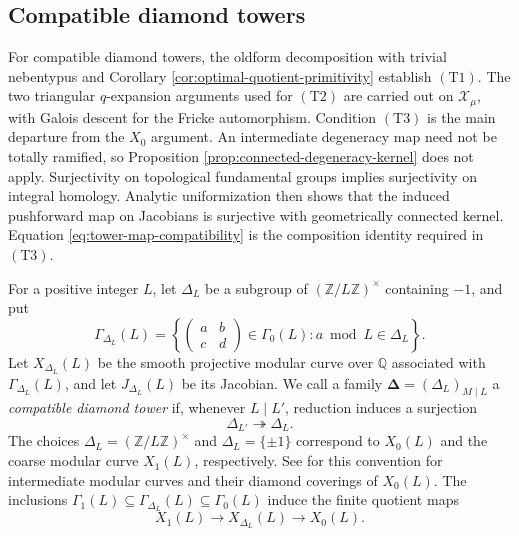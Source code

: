 \documentclass[12pt, letterpaper]{amsart}
\theoremstyle{definition}
\theoremstyle{remark}
\newcommand{\Q}{\mathbb Q}
\newcommand{\Z}{\mathbb Z}
\numberwithin{equation}{section}
\begin{document}
\subsection{Compatible diamond towers}\label{subsec:compatible-diamond-towers}

For compatible diamond towers, the oldform decomposition with trivial
nebentypus and Corollary \ref{cor:optimal-quotient-primitivity} establish
\hyperlink{tower-condition-T1}{\(\mathrm{(T1)}\)}. The two triangular \(q\)-expansion arguments used for
\hyperlink{tower-condition-T2}{\(\mathrm{(T2)}\)} are carried out on \(\mathcal X_\mu\), with Galois descent for
the Fricke automorphism. Condition \hyperlink{tower-condition-T3}{\(\mathrm{(T3)}\)} is the main departure from
the \(X_0\) argument. An intermediate degeneracy map need not be totally
ramified, so Proposition \ref{prop:connected-degeneracy-kernel} does not apply.
Surjectivity on topological fundamental groups implies surjectivity on
integral homology. Analytic uniformization then shows that the induced
pushforward map on Jacobians is surjective with geometrically connected kernel.
Equation \eqref{eq:tower-map-compatibility} is the composition identity required
in \hyperlink{tower-condition-T3}{\(\mathrm{(T3)}\)}.

For a positive integer \(L\), let \(\Delta_L\) be a subgroup of
\((\Z/L\Z)^\times\) containing \(-1\), and put
\[
        \Gamma_{\Delta_L}(L)=
        \left\{
        \begin{pmatrix}a&b\\c&d\end{pmatrix}\in\Gamma_0(L):
        a\bmod L\in\Delta_L
        \right\}.
\]
Let \(X_{\Delta_L}(L)\) be the smooth projective modular curve over \(\Q\)
associated with \(\Gamma_{\Delta_L}(L)\), and let \(J_{\Delta_L}(L)\) be its
Jacobian. We call a family
\(\boldsymbol\Delta=(\Delta_L)_{M\mid L}\) a
\emph{compatible diamond tower} if, whenever \(L\mid L'\), reduction induces a
surjection
\begin{equation}\label{eq:diamond-surjectivity}
        \Delta_{L'}\twoheadrightarrow\Delta_L.
\end{equation}
The choices \(\Delta_L=(\Z/L\Z)^\times\) and \(\Delta_L=\{\pm1\}\) correspond to
\(X_0(L)\) and the coarse modular curve \(X_1(L)\), respectively. See
\cite{IshiiMomose} for this convention for intermediate modular
curves and their diamond coverings of \(X_0(L)\).
The inclusions
\(\Gamma_1(L)\subseteq\Gamma_{\Delta_L}(L)\subseteq\Gamma_0(L)\) induce the
finite quotient maps
\begin{equation}\label{eq:intermediate-quotient-chain}
        X_1(L)\longrightarrow X_{\Delta_L}(L)\longrightarrow X_0(L).
\end{equation}
\end{document}
